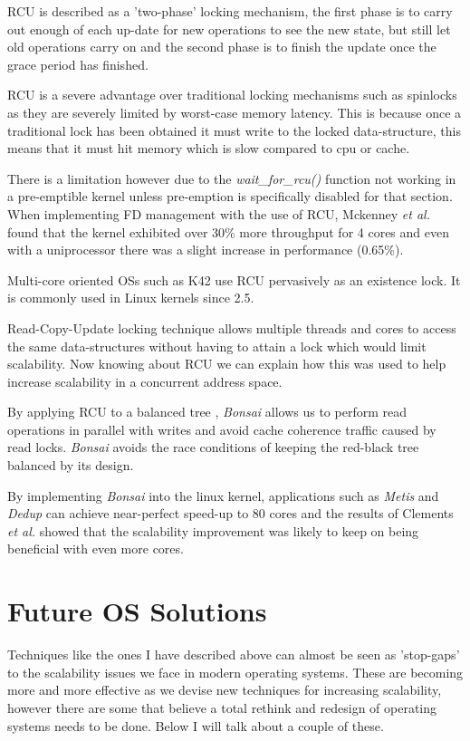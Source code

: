\documentclass[journal]{IEEEtran}
\begin{document}
RCU is described as a 'two-phase' locking mechanism, the first phase is to carry out enough of each up-date for new operations to see the new state, but still let old operations carry on and the second phase is to finish the update once the grace period has finished.

RCU is a severe advantage over traditional locking mechanisms such as spinlocks as they are severely limited by worst-case memory latency. This is because once a traditional lock has been obtained it must write to the locked data-structure, this means that it must hit memory which is slow compared to cpu or cache.

There is a limitation however due to the \emph{wait\_for\_rcu()} function not working in a pre-emptible kernel unless pre-emption is specifically disabled for that section.
When implementing FD management with the use of RCU, Mckenney \emph{et al.} \cite{RCU} found that the kernel exhibited over 30\% more throughput for 4 cores and even with a uniprocessor there was a slight increase in performance (0.65\%).

Multi-core oriented OSs such as K42 use RCU pervasively as an existence lock. It is commonly used in Linux kernels since 2.5.

Read-Copy-Update locking technique allows multiple threads and cores to access the same data-structures without having to attain a lock which would limit scalability. Now knowing about RCU we can explain how this was used to help increase scalability in a concurrent address space.

By applying RCU to a balanced tree \cite{Bonsai}, \emph{Bonsai} allows us to perform read operations in parallel with writes and avoid cache coherence traffic caused by read locks. \emph{Bonsai} avoids the race conditions of keeping the red-black tree balanced by its design.

By implementing \emph{Bonsai} into the linux kernel, applications such as \emph{Metis} and \emph{Dedup} can achieve near-perfect speed-up to 80 cores and the results of Clements \emph{et al.} showed that the scalability improvement was likely to keep on being beneficial with even more cores.

\section{Future OS Solutions}

Techniques like the ones I have described above can almost be seen as 'stop-gaps' to the scalability issues we face in modern operating systems. These are becoming more and more effective as we devise new techniques for increasing scalability, however there are some that believe a total rethink and redesign of operating systems needs to be done. Below I will talk about a couple of these.
\end{document}
